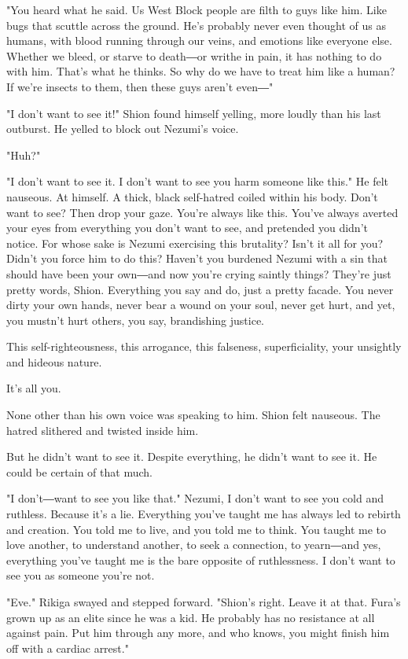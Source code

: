 "You heard what he said. Us West Block people are filth to guys like
him. Like bugs that scuttle across the ground. He's probably never even
thought of us as humans, with blood running through our veins, and
emotions like everyone else. Whether we bleed, or starve to death―or
writhe in pain, it has nothing to do with him. That's what he thinks. So
why do we have to treat him like a human? If we're insects to them, then
these guys aren't even―"

"I don't want to see it!" Shion found himself yelling, more loudly than
his last outburst. He yelled to block out Nezumi's voice.

"Huh?"

"I don't want to see it. I don't want to see you harm someone like
this." He felt nauseous. At himself. A thick, black self-hatred coiled
within his body. Don't want to see? Then drop your gaze. You're always
like this. You've always averted your eyes from everything you don't
want to see, and pretended you didn't notice. For whose sake is Nezumi
exercising this brutality? Isn't it all for you? Didn't you force him to
do this? Haven't you burdened Nezumi with a sin that should have been
your own―and now you're crying saintly things? They're just pretty
words, Shion. Everything you say and do, just a pretty facade. You never
dirty your own hands, never bear a wound on your soul, never get hurt,
and yet, you mustn't hurt others, you say, brandishing justice.

This self-righteousness, this arrogance, this falseness, superficiality,
your unsightly and hideous nature.

It's all you.

None other than his own voice was speaking to him. Shion felt nauseous.
The hatred slithered and twisted inside him.

But he didn't want to see it. Despite everything, he didn't want to see
it. He could be certain of that much.

"I don't―want to see you like that." Nezumi, I don't want to see you
cold and ruthless. Because it's a lie. Everything you've taught me has
always led to rebirth and creation. You told me to live, and you told me
to think. You taught me to love another, to understand another, to seek
a connection, to yearn―and yes, everything you've taught me is the bare
opposite of ruthlessness. I don't want to see you as someone you're not.

"Eve." Rikiga swayed and stepped forward. "Shion's right. Leave it at
that. Fura's grown up as an elite since he was a kid. He probably has no
resistance at all against pain. Put him through any more, and who knows,
you might finish him off with a cardiac arrest."

